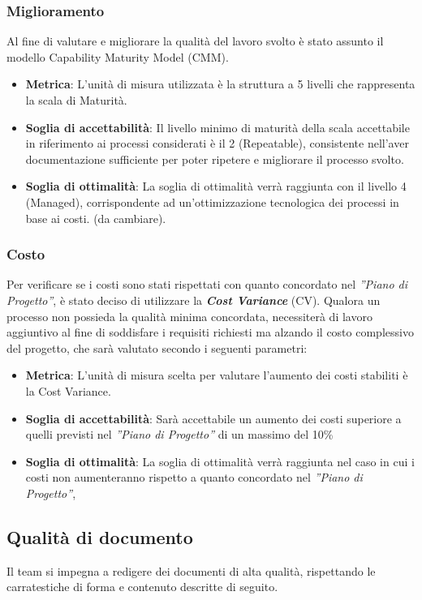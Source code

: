 \subsubsection{Miglioramento}
Al fine di valutare e migliorare la qualità del lavoro svolto è stato assunto il modello Capability Maturity Model (CMM).
\begin{itemize}
	\item \textbf{Metrica}: L'unità di misura utilizzata è la struttura a 5 livelli che rappresenta la scala di Maturità.
	\item \textbf{Soglia di accettabilità}: Il livello minimo di maturità della scala accettabile in riferimento ai processi considerati è il 2 (Repeatable), consistente nell'aver documentazione sufficiente per poter ripetere e migliorare il processo svolto.
	\item \textbf{Soglia di ottimalità}: La soglia di ottimalità verrà raggiunta con il livello 4 (Managed), corrispondente ad un'ottimizzazione tecnologica dei processi in base ai costi. (da cambiare).
\end{itemize}
\subsubsection{Costo}
Per verificare se i costi sono stati rispettati con quanto concordato nel  \emph{''Piano di Progetto''}, è stato deciso di utilizzare la \emph{\textbf{Cost Variance}} (CV).
Qualora un processo non possieda la qualità minima concordata, necessiterà di lavoro aggiuntivo al fine di soddisfare i requisiti richiesti ma alzando il costo complessivo del progetto, che sarà valutato secondo i seguenti parametri:
\begin{itemize}
	\item \textbf{Metrica}: L'unità di misura scelta per valutare l'aumento dei costi stabiliti è la Cost Variance.
	\item \textbf{Soglia di accettabilità}: Sarà accettabile un aumento dei costi superiore a quelli previsti nel \emph{''Piano di Progetto''} di un massimo del 10\%
	\item \textbf{Soglia di ottimalità}: La soglia di ottimalità verrà raggiunta nel caso in cui i costi non aumenteranno rispetto a quanto concordato nel \emph{''Piano di Progetto''}, 
\end{itemize}
\subsection{Qualità di documento}
Il team si impegna a redigere dei documenti di alta qualità, rispettando le carratestiche di forma e contenuto descritte di seguito.
